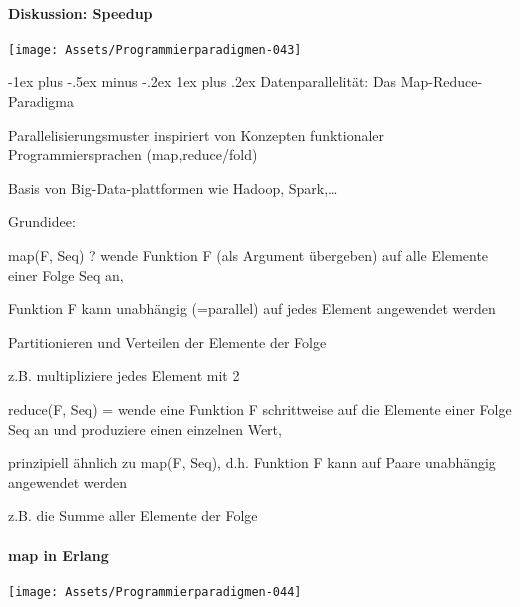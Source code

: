\documentclass[10pt]{article}
\makeatletter
\renewcommand{\subsubsection}{\@startsection{subsubsection}{3}{0mm}%
                                {-1ex plus -.5ex minus -.2ex}%
                                {1ex plus .2ex}%
                                {\normalfont\small\bfseries}}
\makeatother
\begin{document}
\paragraph{Diskussion: Speedup}
\begin{center}
  \texttt{[image: Assets/Programmierparadigmen-043]}
\end{center}

\subsubsection{Datenparallelität: Das Map-Reduce-Paradigma}
\begin{itemize*}
  \item Parallelisierungsmuster inspiriert von Konzepten funktionaler Programmiersprachen (map,reduce/fold)
  \item Basis von Big-Data-plattformen wie Hadoop, Spark,…
  \item Grundidee:
  \begin{itemize*}
    \item map(F, Seq) ? wende Funktion F (als Argument übergeben) auf alle Elemente einer Folge Seq an,
    \begin{itemize*}
      \item Funktion F kann unabhängig (=parallel) auf jedes Element angewendet werden
      \item Partitionieren und Verteilen der Elemente der Folge
      \item z.B. multipliziere jedes Element mit 2
    \end{itemize*}
    \item reduce(F, Seq) = wende eine Funktion F schrittweise auf die Elemente einer Folge Seq an und produziere einen einzelnen Wert,
    \begin{itemize*}
      \item prinzipiell ähnlich zu map(F, Seq), d.h. Funktion F kann auf Paare unabhängig angewendet werden
      \item z.B. die Summe aller Elemente der Folge
    \end{itemize*}
  \end{itemize*}
\end{itemize*}

\paragraph{map in Erlang}
\begin{center}
  \texttt{[image: Assets/Programmierparadigmen-044]}
\end{center}
\end{document}
